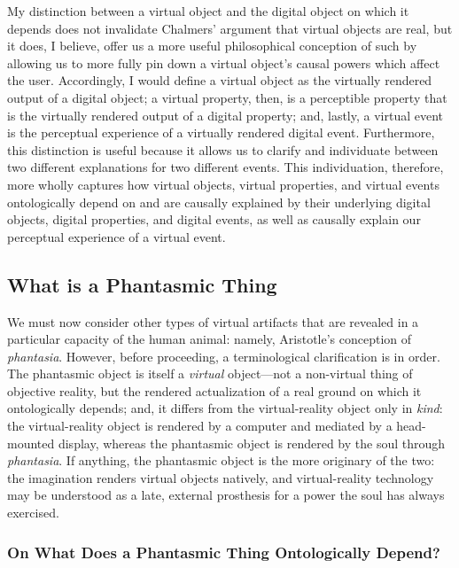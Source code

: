 \documentclass{article}
\begin{document}
My distinction between a virtual object and the digital object on which it depends does not invalidate Chalmers’ argument that virtual objects are real, but it does, I believe, offer us a more useful philosophical conception of such by allowing us to more fully pin down a virtual object’s causal powers which affect the user. Accordingly, I would define a virtual object as the virtually rendered output of a digital object; a virtual property, then, is a perceptible property that is the virtually rendered output of a digital property; and, lastly, a virtual event is the perceptual experience of a virtually rendered digital event. Furthermore, this distinction is useful because it allows us to clarify and individuate between two different explanations for two different events. This individuation, therefore, more wholly captures how virtual objects, virtual properties, and virtual events ontologically depend on and are causally explained by their underlying digital objects, digital properties, and digital events, as well as causally explain our perceptual experience of a virtual event.

\subsection*{What is a Phantasmic Thing}

We must now consider other types of virtual artifacts that are revealed in a particular capacity of the human animal: namely, Aristotle's conception of \textit{phantasia}. However, before proceeding, a terminological clarification is in order. The phantasmic object is itself a \textit{virtual} object—not a non-virtual thing of objective reality, but the rendered actualization of a real ground on which it ontologically depends; and, it differs from the virtual-reality object only in \textit{kind}: the virtual-reality object is rendered by a computer and mediated by a head-mounted display, whereas the phantasmic object is rendered by the soul through \textit{phantasia}. If anything, the phantasmic object is the more originary of the two: the imagination renders virtual objects natively, and virtual-reality technology may be understood as a late, external prosthesis for a power the soul has always exercised.

\subsubsection*{On What Does a Phantasmic Thing Ontologically Depend?}
\end{document}
